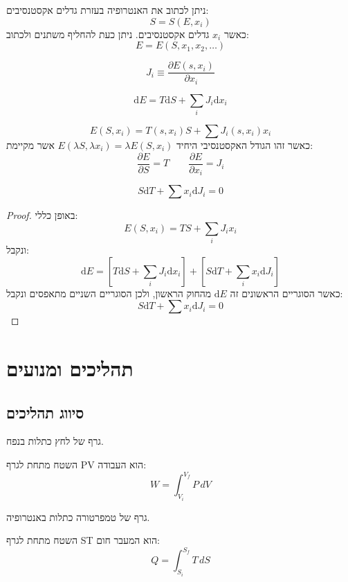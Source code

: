 \documentclass{tstextbook}
\begin{document}
\begin{proposition}
ניתן לכתוב את האנטרופיה בעזרת גדלים אקסטנסיבים:
$$S=S(E,x_{i})$$
כאשר \(x_{i}\) גדלים אקסטנסיבים. ניתן כעת להחליף משתנים ולכתוב:
$$E=E\left( S,x_{1},x_{2},\dots \right)$$

\end{proposition}
\begin{definition}
$$J_{i}\equiv \frac{\partial E(s,x_{i})}{\partial x_{i}} $$

\end{definition}
\begin{theorem}
$$\mathrm{d}E=T\mathrm{d}S+\sum_{i}J_{i}\mathrm{d}x_{i}$$

\end{theorem}
\begin{corollary}
$$E(S,x_{i})=T(s,x_{i})S+\sum J_{i}(s,x_{i})x_{i}$$
כאשר זהו הגודל האקסטנסיבי היחיד \(E(\lambda S,\lambda x_{i})=\lambda E(S,x_{i})\) אשר מקיימת:
$$\frac{\partial E}{\partial S} =T\qquad \frac{\partial E}{\partial x_{i}} =J_{i}$$

\end{corollary}
\begin{proposition}
$$S\mathrm{d}T+\sum x_{i}\mathrm{d}J_{i}=0$$

\end{proposition}
\begin{proof}
באופן כללי:
$$E(S,x_{i})=TS+\sum_{i}J_{i}x_{i}$$
ונקבל:
$$\mathrm{d}E=\left[ T\mathrm{d}S+\sum_{i}J_{i}\mathrm{d}x_{i} \right]+\left[ S\mathrm{d}T+\sum_{i}x_{i} \mathrm{d}J_{i} \right]$$
כאשר הסוגריים הראשונים זה \(\mathrm{d}E\) מהחוק הראשון, ולכן הסוגריים השניים מתאפסים ונקבל:
$$S\mathrm{d}T+\sum x_{i}\mathrm{d}J_{i}=0$$

\end{proof}
\chapter{תהליכים ומנועים}

\section{סיווג תהליכים}

\begin{definition}[גרף PV]
גרף של לחץ כתלות בנפח.

\end{definition}
\begin{proposition}
השטח מתחת לגרף PV הוא העבודה:
$$W=\int_{V_{i}}^{V_{f}}P\,d V$$

\end{proposition}
\begin{definition}[גרף ST]
גרף של טמפרטורה כתלות באנטרופיה.

\end{definition}
\begin{proposition}
השטח מתחת לגרף ST הוא המעבר חום:
$$Q=\int_{S_{i}}^{S_{f}}T\,d S$$

\end{proposition}
\end{document}
